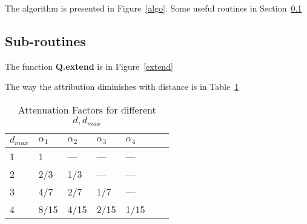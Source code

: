 The algorithm is presented in Figure~\ref{algo}. Some useful routines in
Section~\ref{aux_algo}
\subsection{Sub-routines}
\label{aux_algo}

\bi
\item The function {\bf Q.extend} is in Figure~\ref{extend}
\item The way the attribution diminishes with distance is in Table~\ref{attenuate}
\ei

\begin{figure}
\centering
{}
\end{figure}


\begin{table}[hp]
\centering
\begin{tabular}{|l|l|l|l|l|l|l|} \hline \hline
\(d_{max}\) & \(\alpha_1\)  & \(\alpha_2\)  & \(\alpha_3\)  & \(\alpha_4\)
\\ \hline
1 & 1 & --- & --- & --- \\ \hline
2 & 2/3 & 1/3 & --- & --- \\ \hline
3 & 4/7 & 2/7 & 1/7 & --- \\ \hline
4 & 8/15 & 4/15 & 2/15 & 1/15 \\ \hline
\hline
\end{tabular}
\caption{Attenuation Factors for different \(d, d_{max}\)}
\label{attenuate}
\end{table}


